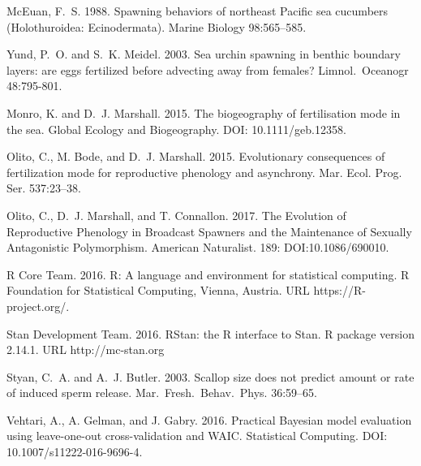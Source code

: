 \documentclass{article}
\begin{document}
\begin{thebibliography}{}
McEuan, F.~S. 1988.
\newblock Spawning behaviors of northeast Pacific sea cucumbers (Holothuroidea: Ecinodermata).
\newblock Marine Biology 98:565--585.

Yund, P.~O. and S.~K. Meidel. 2003.
\newblock Sea urchin spawning in benthic boundary layers: are eggs fertilized before advecting away from females?
\newblock Limnol.~Oceanogr 48:795-801.

Monro, K. and D.~J. Marshall. 2015.
\newblock The biogeography of fertilisation mode in the sea.
\newblock Global Ecology and Biogeography. DOI: 10.1111/geb.12358.

Olito, C., M. Bode, and D.~J. Marshall. 2015.
\newblock Evolutionary consequences of fertilization mode for reproductive phenology and asynchrony.
\newblock Mar. Ecol. Prog. Ser. 537:23--38.

Olito, C., D.~J. Marshall, and T. Connallon. 2017.
\newblock The Evolution of Reproductive Phenology in Broadcast Spawners and the Maintenance of Sexually Antagonistic Polymorphism.
\newblock American Naturalist. 189: DOI:10.1086/690010.

R Core Team. 2016.
\newblock R: A language and environment for statistical computing. 
\newblock R Foundation for Statistical Computing, Vienna, Austria. URL https://R-project.org/.

Stan Development Team. 2016.
\newblock RStan: the R interface to Stan.
\newblock R package version 2.14.1. URL http://mc-stan.org

Styan, C.~A. and A.~J. Butler. 2003.
\newblock Scallop size does not predict amount or rate of induced sperm release.
\newblock Mar.~Fresh.~Behav.~Phys. 36:59--65.

Vehtari, A., A. Gelman, and J. Gabry. 2016.
\newblock Practical Bayesian model evaluation using leave-one-out cross-validation and WAIC.
\newblock Statistical Computing. DOI: 10.1007/s11222-016-9696-4.


\end{thebibliography}

\newpage{}
\end{document}
